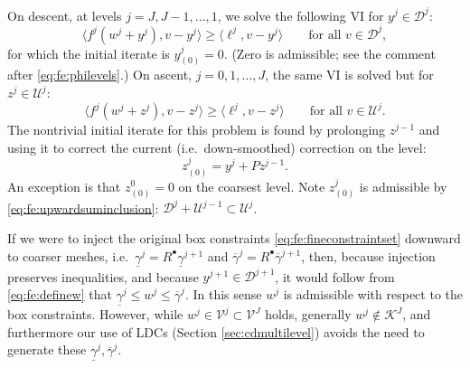 \documentclass[letterpaper,final,12pt,reqno]{amsart}
\theoremstyle{cstyle}
\theoremstyle{cstyle*}
\theoremstyle{dstyle}
\numberwithin{equation}{section}
\numberwithin{figure}{section}
\numberwithin{table}{section}
\numberwithin{theorem}{section}
\newcommand{\cK}{\mathcal{K}}
\newcommand{\cV}{\mathcal{V}}
\newcommand{\ip}[2]{\langle#1,#2\rangle}
\newcommand{\iR}{R^{\bullet}}
\begin{document}
On descent, at levels $j=J,J-1,\dots,1$, we solve the following VI for $y^j \in \mathcal{D}^j$:
\begin{equation}
\ip{f^j(w^j + y^j)}{v-y^j} \ge \ip{\ell^j}{v-y^j} \qquad \text{for all } v\in \mathcal{D}^j, \label{eq:fe:downvi}
\end{equation}
for which the initial iterate is $y_{(0)}^j=0$.  (Zero is admissible; see the comment after \eqref{eq:fe:philevels}.)  On ascent, $j=0,1,\dots,J$, the same VI is solved but for $z^j \in \mathcal{U}^j$:
\begin{equation}
\ip{f^j(w^j + z^j)}{v-z^j} \ge \ip{\ell^j}{v-z^j} \qquad \text{for all } v\in \mathcal{U}^j. \label{eq:fe:upvi}
\end{equation}
The nontrivial initial iterate for this problem is found by prolonging $z^{j-1}$ and using it to correct the current (i.e.~down-smoothed) correction on the level:
\begin{equation}
z_{(0)}^j = y^j + P z^{j-1}.  \label{eq:fe:upwardinitial}
\end{equation}
An exception is that $z_{(0)}^0=0$ on the coarsest level.  Note $z_{(0)}^j$ is admissible by \eqref{eq:fe:upwardsuminclusion}: $\mathcal{D}^j + \mathcal{U}^{j-1} \subset \mathcal{U}^j$.

If we were to inject the original box constraints \eqref{eq:fe:fineconstraintset} downward to coarser meshes, i.e.~$\underline{\gamma}^j = \iR \underline{\gamma}^{j+1}$ and $\overline{\gamma}^j = \iR \overline{\gamma}^{j+1}$, then, because injection preserves inequalities, and because $y^{j+1} \in \mathcal{D}^{j+1}$, it would follow from \eqref{eq:fe:definew} that $\underline{\gamma}^j \le w^j \le \overline{\gamma}^j$.  In this sense $w^j$ is admissible with respect to the box constraints.  However, while $w^j \in \cV^j \subset \cV^J$ holds, generally $w^j \notin \cK^J$, and furthermore our use of LDCs (Section \ref{sec:cdmultilevel}) avoids the need to generate these $\underline{\gamma}^j, \overline{\gamma}^j$.
\end{document}
